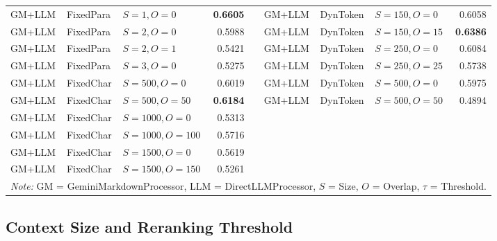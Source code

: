 \documentclass[12pt]{article} %
\begin{document}
\begin{table}[htbp]
\begin{tabular}{lll r c lll r}
        \cmidrule(r){1-4} \cmidrule{6-9}
        GM+LLM         & FixedPara        & $S{=}1, O{=}0$      & \textbf{0.6605} &       & GM+LLM         & DynToken         & $S{=}150, O{=}0$       & 0.6058          \\
        GM+LLM         & FixedPara        & $S{=}2, O{=}0$      & 0.5988          &       & GM+LLM         & DynToken         & $S{=}150, O{=}15$      & \textbf{0.6386} \\
        GM+LLM         & FixedPara        & $S{=}2, O{=}1$      & 0.5421          &       & GM+LLM         & DynToken         & $S{=}250, O{=}0$       & 0.6084          \\
        GM+LLM         & FixedPara        & $S{=}3, O{=}0$      & 0.5275          &       & GM+LLM         & DynToken         & $S{=}250, O{=}25$      & 0.5738          \\
        \cmidrule(r){1-4}
        GM+LLM         & FixedChar        & $S{=}500, O{=}0$    & 0.6019          &       & GM+LLM         & DynToken         & $S{=}500, O{=}0$       & 0.5975          \\
        GM+LLM         & FixedChar        & $S{=}500, O{=}50$   & \textbf{0.6184} &       & GM+LLM         & DynToken         & $S{=}500, O{=}50$      & 0.4894          \\
        GM+LLM         & FixedChar        & $S{=}1000, O{=}0$   & 0.5313          &       &                &                  &                        &                 \\
        GM+LLM         & FixedChar        & $S{=}1000, O{=}100$ & 0.5716          &       &                &                  &                        &                 \\
        GM+LLM         & FixedChar        & $S{=}1500, O{=}0$   & 0.5619          &       &                &                  &                        &                 \\
        GM+LLM         & FixedChar        & $S{=}1500, O{=}150$ & 0.5261          &       &                &                  &                        &                 \\
        \bottomrule
        \multicolumn{9}{l}{\textit{Note:} GM = GeminiMarkdownProcessor, LLM = DirectLLMProcessor, $S$ = Size, $O$ = Overlap, $\tau$ = Threshold.}
    \end{tabular}
\end{table}

\FloatBarrier

\subsection{Context Size and Reranking Threshold}
\end{document}
